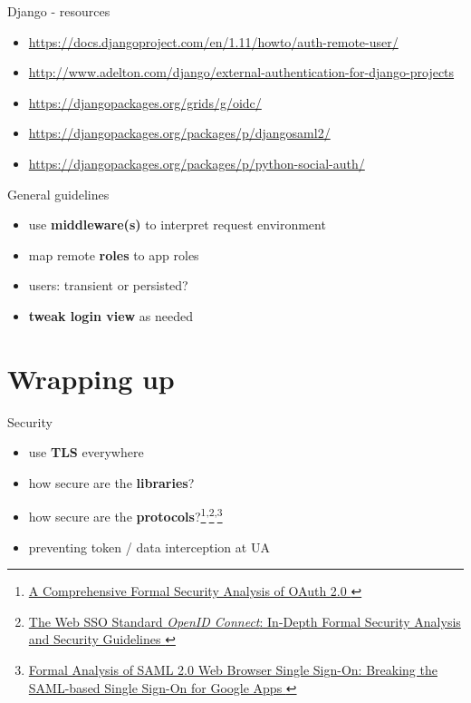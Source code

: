 \documentclass[ignorenonframetext,aspectratio=169]{beamer}
\providecommand{\tightlist}{%
  \setlength{\itemsep}{0pt}\setlength{\parskip}{0pt}}
\begin{document}
\begin{frame}{Django - resources}
\begin{itemize}
\tightlist

\item \url{https://docs.djangoproject.com/en/1.11/howto/auth-remote-user/}
\item \url{http://www.adelton.com/django/external-authentication-for-django-projects}
\item \url{https://djangopackages.org/grids/g/oidc/}
\item \url{https://djangopackages.org/packages/p/djangosaml2/}
\item \url{https://djangopackages.org/packages/p/python-social-auth/}

\end{itemize}
\end{frame}

\begin{frame}{General guidelines}
\begin{itemize}
\tightlist
\item use {\bf middleware(s)} to interpret request environment
\item map remote {\bf roles} to app roles
\item users: transient or persisted?
\item {\bf tweak login view} as needed
\end{itemize}
\end{frame}

\section{Wrapping up}

\begin{frame}{Security}
\begin{itemize}
\tightlist
\item use {\bf TLS} everywhere
\item how secure are the {\bf libraries}?
\item how secure are the {\bf
    protocols}?\footnote{
        \href{https://arxiv.org/pdf/1601.01229v2.pdf}{
            A Comprehensive Formal Security Analysis of OAuth 2.0
        }
    }\textsuperscript{,}\footnote{
        \href{https://arxiv.org/pdf/1704.08539.pdf}{
            The Web SSO Standard {\em OpenID Connect}:
            In-Depth Formal Security Analysis and Security Guidelines
        }
    }\textsuperscript{,}\footnote{
        \href{https://ai-lab.it/armando/pub/fmse9-armando.pdf}{
            Formal Analysis of SAML 2.0 Web Browser Single Sign-On:
            Breaking the SAML-based Single Sign-On for Google Apps
        }
    }
\item preventing token / data interception at UA
\end{itemize}
\end{frame}
\end{document}
